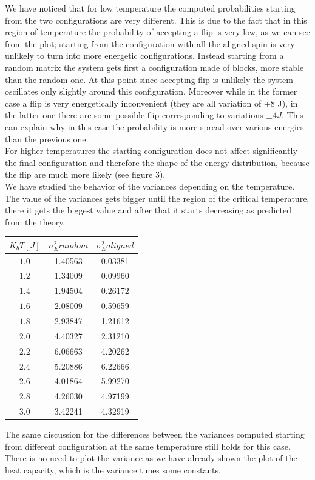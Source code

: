 \documentclass[10pt,a4paper,titlepage]{article}
\begin{document}
\noindent We have noticed that for low temperature the computed probabilities starting from the two configurations are very different. This is due to the fact that in this region of temperature the probability of accepting a flip is very low, as we can see from the plot; starting from the configuration with all the aligned spin is very unlikely to turn into more energetic configurations. Instead starting from a random matrix the system gets first a configuration made of blocks, more stable than the random one. At this point since accepting flip is unlikely the system oscillates only slightly around this configuration. Moreover while in the former case a flip is very energetically inconvenient (they are all variation of +8 J), in the latter one there are some possible flip corresponding to variations $\pm 4 J$. This can explain why in this case the probability is more spread over various energies 
than the previous one. 
\\
For higher temperatures the starting configuration does not affect significantly the final configuration and therefore the shape of the energy distribution, because the flip are much more likely (see figure 3).
\\
We have studied the behavior of the variances depending on the temperature. The value of the variances gets bigger until the region of the critical temperature, there it gets the biggest value and after that it starts decreasing as predicted from the theory.  
\begin{center}
\begin{tabular}[t]{|c|c|c|}
\hline
$K_b T [J]$ & $ \sigma^2_E random $ & $\sigma^2_E aligned$\\\hline
$1.0$ & 1.40563 & 0.03381\\\hline
$1.2$& 1.34009 &0.09960\\\hline
$1.4$ &  1.94504 &0.26172\\\hline
$1.6$ & 2.08009 &0.59659\\\hline
$1.8$&  2.93847 &1.21612\\\hline
$2.0$& 4.40327  &2.31210\\\hline
$2.2$& 6.06663  &4.20262\\\hline
$2.4$&5.20886& 6.22666\\\hline
$2.6$&  4.01864   &5.99270\\\hline
$2.8$& 4.26030 &4.97199\\\hline
$3.0$& 3.42241 & 4.32919\\\hline
\end{tabular}
\end{center}
The same discussion for the differences between the variances computed starting from different configuration at the same temperature still holds for this case. There is no need to plot the variance as we have already shown the plot of the heat capacity, which is the variance times some constants.
\end{document}
